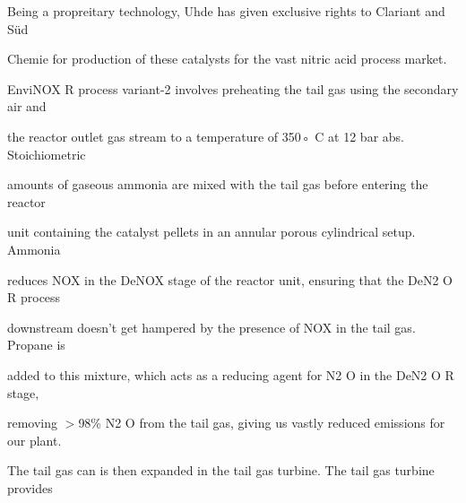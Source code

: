 \documentclass[a4paper,portrait,12pt]{article}
\begin{document}
\begin{flushleft}
Being a propreitary technology, Uhde has given exclusive rights to Clariant and Süd
\end{flushleft}


\begin{flushleft}
Chemie for production of these catalysts for the vast nitric acid process market.
\end{flushleft}


\begin{flushleft}
EnviNOX R process variant-2 involves preheating the tail gas using the secondary air and
\end{flushleft}


\begin{flushleft}
the reactor outlet gas stream to a temperature of 350◦ C at 12 bar abs. Stoichiometric
\end{flushleft}


\begin{flushleft}
amounts of gaseous ammonia are mixed with the tail gas before entering the reactor
\end{flushleft}


\begin{flushleft}
unit containing the catalyst pellets in an annular porous cylindrical setup. Ammonia
\end{flushleft}


\begin{flushleft}
reduces NOX in the DeNOX stage of the reactor unit, ensuring that the DeN2 O R process
\end{flushleft}


\begin{flushleft}
downstream doesn't get hampered by the presence of NOX in the tail gas. Propane is
\end{flushleft}


\begin{flushleft}
added to this mixture, which acts as a reducing agent for N2 O in the DeN2 O R stage,
\end{flushleft}


\begin{flushleft}
removing $>$98\% N2 O from the tail gas, giving us vastly reduced emissions for our plant.
\end{flushleft}


\begin{flushleft}
The tail gas can is then expanded in the tail gas turbine. The tail gas turbine provides
\end{flushleft}
\end{document}
